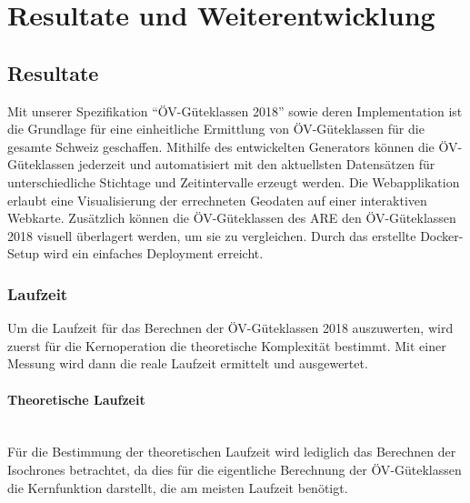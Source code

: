 
\section{Resultate und Weiterentwicklung}
\label{Resultate und Weiterentwicklung}


\subsection{Resultate}
\label{Resultate und Weiterentwicklung:Resultate}

Mit unserer Spezifikation "`\acs{ÖV}-Güteklassen 2018"' sowie deren Implementation ist die Grundlage für eine einheitliche Ermittlung von \acs{ÖV}-Güteklassen für die gesamte Schweiz geschaffen.
Mithilfe des entwickelten Generators können die \acs{ÖV}-Güteklassen jederzeit und automatisiert mit den aktuellsten Datensätzen für unterschiedliche Stichtage und Zeitintervalle erzeugt werden.
Die Webapplikation erlaubt eine Visualisierung der errechneten Geodaten auf einer interaktiven Webkarte.
Zusätzlich können die \acs{ÖV}-Güteklassen des \ac{ARE} den \acs{ÖV}-Güteklassen 2018 visuell überlagert werden, um sie zu vergleichen.
Durch das erstellte Docker-Setup wird ein einfaches Deployment erreicht.


\subsubsection{Laufzeit}
\label{Resultate und Weiterentwicklung:Laufzeit}

Um die Laufzeit für das Berechnen der \acs{ÖV}-Güteklassen 2018 auszuwerten, wird zuerst für die Kernoperation die theoretische Komplexität bestimmt.
Mit einer Messung wird dann die reale Laufzeit ermittelt und ausgewertet.

\paragraph{Theoretische Laufzeit}\label{Laufzeit:Theoretische Laufzeit}~\\
Für die Bestimmung der theoretischen Laufzeit wird lediglich das Berechnen der \glspl{Isochrone} betrachtet, da dies für die eigentliche Berechnung der \acs{ÖV}-Güteklassen die Kernfunktion darstellt, die am meisten Laufzeit benötigt.

